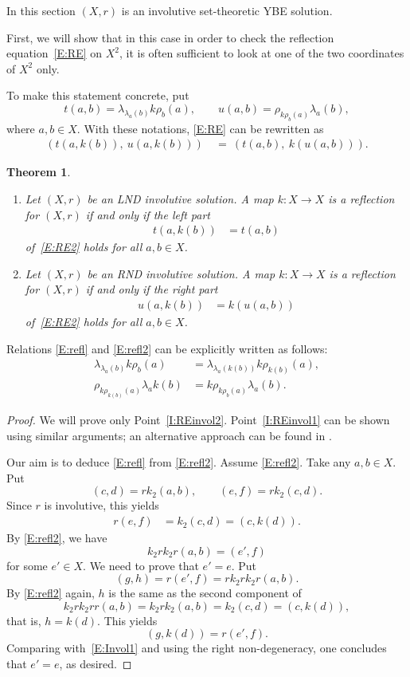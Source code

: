 \documentclass{amsart}
\theoremstyle{plain}
\newtheorem{thm}{Theorem}[section]
\theoremstyle{definition}
\theoremstyle{remark}
\begin{document}
In this section $(X,r)$ is an involutive set-theoretic YBE solution. 

First, we will show that in this case in order to check the reflection equation~\eqref{E:RE} on $X^2$, it is often sufficient to look at one of the two coordinates of $X^2$ only.

To make this statement concrete, put
\[t(a,b) = \lambda_{\lambda_a(b)}k\rho_b (a), \qquad u(a,b) = \rho_{k \rho_b(a)}\lambda_a(b),\]
where $a,b \in X$. With these notations, \ref{E:RE} can be rewritten as
\begin{align}
(t(a, k(b)),\ u(a, k(b))) &\ =\  (t(a, b),\ k(u(a, b))).\label{E:RE2}
\end{align}

\begin{thm}\label{T:InvolHalf}
\begin{enumerate}
\item\label{I:REinvol1} \cite{SVW18} Let $(X,r)$ be an LND involutive solution. A map $k \colon X \to X$ is a reflection for $(X,r)$ if and only if the left part 
\begin{align}
t(a, k(b)) &= t(a, b)\label{E:refl}
\end{align}
of~\eqref{E:RE2} holds for all $a,b \in X$.
\item\label{I:REinvol2} Let $(X,r)$ be an RND involutive solution. A map $k \colon X \to X$ is a reflection for $(X,r)$ if and only if the right part
\begin{align}
u(a, k(b)) &= k(u(a, b))\label{E:refl2}
\end{align}
of~\eqref{E:RE2} holds for all $a,b \in X$.
\end{enumerate}
\end{thm}

Relations \eqref{E:refl} and \eqref{E:refl2} can be explicitly written as follows:
\begin{align}
\lambda_{\lambda_a(b)}k\rho_b (a) &=\lambda_{\lambda_a(k(b))}k\rho_{k(b)} (a),\label{E:reflExplicit}\\
\rho_{k \rho_{k(b)}(a)}\lambda_ak(b) &= k\rho_{k \rho_b(a)}\lambda_a(b).\label{E:refl2Explicit}
\end{align}

\begin{proof}
We will prove only Point~\ref{I:REinvol2}. Point~\ref{I:REinvol1} can be shown using similar arguments; an alternative approach can be found in \cite{SVW18}.

Our aim is to deduce \eqref{E:refl} from \eqref{E:refl2}. Assume \eqref{E:refl2}. Take any $a,b \in X$. Put
\[(c,d)=rk_2(a,b), \qquad (e,f)=rk_2(c,d).\]
Since $r$ is involutive, this yields
\begin{align}
r(e,f)&=k_2(c,d)=(c,k(d)).\label{E:Invol1}
\end{align}
By \eqref{E:refl2}, we have
\[k_2rk_2r(a,b)=(e',f)\]
for some $e' \in X$. We need to prove that $e'=e$. Put 
\[(g,h)=r(e',f)=rk_2rk_2r(a,b).\]
By \eqref{E:refl2} again, $h$ is the same as the second component of
\[k_2rk_2rr(a,b)=k_2rk_2(a,b)=k_2(c,d)=(c,k(d)),\]
that is, $h=k(d)$. This yields
\[(g,k(d))=r(e',f).\]
Comparing with~\eqref{E:Invol1} and using the right non-degeneracy, one concludes that $e'=e$, as desired.
\end{proof}
\end{document}
